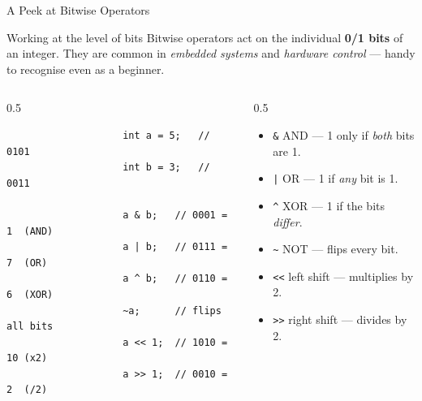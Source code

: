 \documentclass[aspectratio=169]{beamer}
\begin{document}
	\begin{frame}[fragile]{A Peek at Bitwise Operators}
		\begin{block}{Working at the level of bits}
			Bitwise operators act on the individual \textbf{0/1 bits} of an integer. They are common in
			\emph{embedded systems} and \emph{hardware control} --- handy to recognise even as a beginner.
		\end{block}
		\begin{columns}[T]
			\begin{column}{0.5\textwidth}
				\begin{lstlisting}
					int a = 5;   // 0101
					int b = 3;   // 0011
					
					a & b;   // 0001 = 1  (AND)
					a | b;   // 0111 = 7  (OR)
					a ^ b;   // 0110 = 6  (XOR)
					~a;      // flips all bits
					a << 1;  // 1010 = 10 (x2)
					a >> 1;  // 0010 = 2  (/2)
				\end{lstlisting}
			\end{column}
			\begin{column}{0.5\textwidth}
				\begin{itemize}\small
					\item \texttt{\&} AND --- 1 only if \emph{both} bits are 1.
					\item \texttt{|} OR --- 1 if \emph{any} bit is 1.
					\item \texttt{\textasciicircum} XOR --- 1 if the bits \emph{differ}.
					\item \texttt{\textasciitilde} NOT --- flips every bit.
					\item \texttt{<<} left shift --- multiplies by 2.
					\item \texttt{>>} right shift --- divides by 2.
				\end{itemize}
			\end{column}
		\end{columns}
	\end{frame}
	
\end{document}

